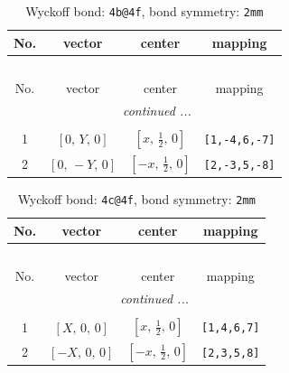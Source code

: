 \documentclass[fleqn,8pt]{jsarticle}
\begin{document}
\renewcommand{\arraystretch}{1.2}
\begin{longtable}{cccc}
\caption{Wyckoff bond: {\tt 4b@4f}, bond symmetry: {\tt 2mm}}
 \\
 \hline \hline
No. & vector & center & mapping \\ \hline \endfirsthead

\multicolumn{3}{l}{\tablename\ \thetable{}} \\
 \hline \hline
No. & vector & center & mapping \\ \hline \endhead

 \hline \hline
\multicolumn{3}{r}{\footnotesize\it continued ...} \\ \endfoot

 \hline \hline
\multicolumn{3}{r}{} \\ \endlastfoot

1 & $\left[ 0,\, Y,\, 0 \right]$ & $\left[ x,\, \frac{1}{2},\, 0 \right]$ & {\tt [1,-4,6,-7]} \\ \hline
2 & $\left[ 0,\, - Y,\, 0 \right]$ & $\left[ - x,\, \frac{1}{2},\, 0 \right]$ & {\tt [2,-3,5,-8]} \\
\end{longtable}
\renewcommand{\arraystretch}{1.2}
\begin{longtable}{cccc}
\caption{Wyckoff bond: {\tt 4c@4f}, bond symmetry: {\tt 2mm}}
 \\
 \hline \hline
No. & vector & center & mapping \\ \hline \endfirsthead

\multicolumn{3}{l}{\tablename\ \thetable{}} \\
 \hline \hline
No. & vector & center & mapping \\ \hline \endhead

 \hline \hline
\multicolumn{3}{r}{\footnotesize\it continued ...} \\ \endfoot

 \hline \hline
\multicolumn{3}{r}{} \\ \endlastfoot

1 & $\left[ X,\, 0,\, 0 \right]$ & $\left[ x,\, \frac{1}{2},\, 0 \right]$ & {\tt [1,4,6,7]} \\ \hline
2 & $\left[ - X,\, 0,\, 0 \right]$ & $\left[ - x,\, \frac{1}{2},\, 0 \right]$ & {\tt [2,3,5,8]} \\
\end{longtable}
\renewcommand{\arraystretch}{1.2}
\end{document}
